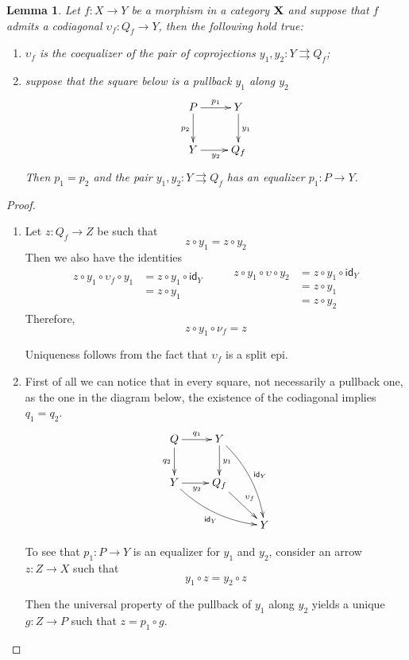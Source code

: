 \documentclass[a4paper]{article}
\newcommand{\id}[1]{\mathsf{id}_{#1}}
\def\X{\textbf {\textup{X}}}
\newtheorem{lemma}[theorem]{Lemma}
\theoremstyle{definition}
\begin{document}
\begin{lemma}\label{rem:coeq}
	Let $f\colon X\to Y$ be a morphism in a category $\X$ and suppose that $f$ admits a codiagonal $\upsilon_f\colon Q_f\to Y$, then the following hold true:
	\begin{enumerate}
		\item $\upsilon_f$ is the coequalizer of the pair of coprojections $y_1, y_2\colon Y\rightrightarrows Q_f$;
		\item suppose that the square below is a pullback $y_1$ along $y_2$
		\[\xymatrix{P \ar[r]^{p_1} \ar[d]_{p_2} & Y \ar[d]^{y_1}\\  Y\ar[r]_{y_2} &  Q_f}\]
		Then $p_1=p_2$ and the pair $y_1, y_2\colon Y\rightrightarrows Q_f$ has an equalizer $p_1\colon P\to Y$.
	\end{enumerate}
\end{lemma}
\begin{proof}\begin{enumerate}
		\item  Let $z\colon Q_f\to Z$ be such that
		\[z\circ y_1=z\circ y_2\]
		Then we also have the identities
		\[\begin{split}
			z\circ y_1 \circ \upsilon_f  \circ y_1 &=z\circ y_1 \circ \id{Y}\\&= z\circ y_1\\&
		\end{split}\qquad \begin{split}z\circ y_1\circ \upsilon \circ  y_2&= z\circ y_1 \circ \id{Y}\\&=z\circ y_1\\&=z\circ y_2
		\end{split}\]
		Therefore, \[z\circ y_1 \circ \nu_f=z\]	
		
		Uniqueness follows from the fact that $\upsilon_f$ is a split epi.
		\item  First of all we can notice that in every square, not necessarily a pullback one, as the one in the diagram below, the existence of the codiagonal implies $q_1=q_2$.
		\[\xymatrix{Q \ar[r]^{q_1} \ar[d]_{q_2} & Y \ar[d]^{y_1} \ar@/^.3cm/[ddr]^{\id{Y}}\\  Y\ar[r]_{y_2}  \ar@/_.3cm/[drr]_{\id{Y}}&  Q_f\ar[dr]^{\upsilon_f}\\ && Y}\]
		
		To see that $p_1\colon P \to Y$ is an equalizer for $y_1$ and $y_2$, consider an arrow $z\colon Z\to X$ such that
		\[y_1\circ z=y_2\circ z\]
		
		Then the universal property of the pullback of $y_1$ along $y_2$ yields a unique $g\colon Z\to P$ such that $z=p_1\circ g$.
		\qedhere
	\end{enumerate}
\end{proof}
\end{document}
